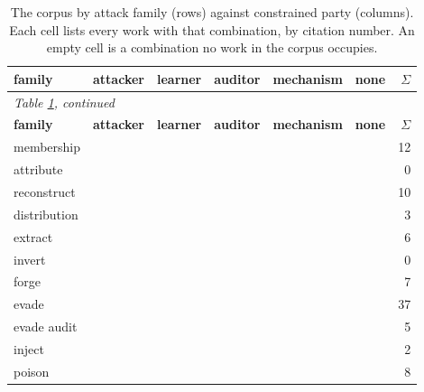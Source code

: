 \begin{landscape}
\begingroup\scriptsize\setlength{\tabcolsep}{3pt}
\begin{longtable}{lp{3.10cm}p{3.10cm}p{3.10cm}p{3.10cm}p{3.10cm}r}
\caption{The corpus by attack family (rows) against constrained party (columns). Each cell lists every work with that combination, by citation number. An empty cell is a combination no work in the corpus occupies.}\label{tab:family-party}\\
\toprule \textbf{family} & \textbf{attacker} & \textbf{learner} & \textbf{auditor} & \textbf{mechanism} & \textbf{none} & \textbf{$\Sigma$} \\ \midrule\endfirsthead
\multicolumn{7}{l}{\emph{Table \ref{tab:family-party}, continued}}\\
\toprule \textbf{family} & \textbf{attacker} & \textbf{learner} & \textbf{auditor} & \textbf{mechanism} & \textbf{none} & \textbf{$\Sigma$} \\ \midrule\endhead
\bottomrule\endfoot
membership & \cite{CCNSTT22,GIKKM23,HSU25,SSSS17,VDKMR26} &  & \cite{ZDKT25} &  & \cite{AZT24,DSMMSZTCEH24,DZT25,MSJFRM25,RL21,YGFJ18} & 12 \\
attribute &  &  &  &  &  & 0 \\
reconstruct & \cite{BDJV22,CKMMNST25,DN03,HMST22,HU14,ML24} &  &  &  & \cite{BCH22,CHSS24,KMNS26,WLBZ25} & 10 \\
distribution & \cite{SE22,Son24,XSD24} &  &  &  &  & 3 \\
extract & \cite{CCGJY20,CCHRSS24,CJM20,DKLP22,JCBKP20} &  &  &  & \cite{SSEP24} & 6 \\
invert &  &  &  &  &  & 0 \\
forge & \cite{DJYWWMNL26,FJTYCDCP23,JYCDTCP21,ZFWCSXZ26} &  &  &  & \cite{KCC23,SHKBL25,TJSP22} & 7 \\
evade & \cite{ACW18,APU25,CAPBRTGMK19,CASDFCMH21,CGBSHC22,CRK19,CYDS26,DMM20,EMM20,FFF18,FK24,GJMM20,HDDH26,LAGHJ19,Mah19,PSV23,SLDLN25,SSTTM18,SSZHTE24,SWKBC25,SYLZZRB19,TCBM20,TSETM19,WK18} & \cite{AH23,BLPR18,BPR19,CBM18,DNV19,MHS19,MHS22} & \cite{BGGKRR26} &  & \cite{FTHMLD26,GCSGWVBHMB25,GMFSRWG18,MDM19,MZME19} & 37 \\
evade audit & \cite{CGZ24,ZCSL24} &  & \cite{NK26} &  & \cite{RCA24,Sha23} & 5 \\
inject &  &  & \cite{ZYWGW25} &  & \cite{DSFHCFKSTT25} & 2 \\
poison & \cite{LCMER25,LXSWLGZX25,MMM19,SKL17} & \cite{BBHS22,DIKR25,DKKLMS16,WZDD24} &  &  &  & 8 \\

\end{longtable}
\end{landscape}
